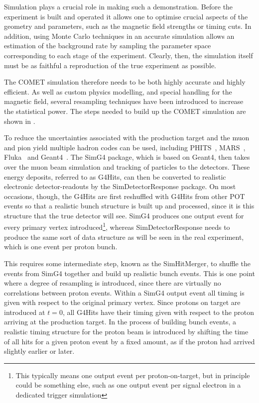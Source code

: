 Simulation plays a crucial role in making such a demonstration. 
Before the experiment is built and operated it allows one to optimise crucial aspects of the geometry and parameters, such as the magnetic field strengths or timing cuts.
In addition, using Monte Carlo techniques in an accurate simulation allows an estimation of the background rate by sampling the parameter space corresponding to each stage of the experiment.
Clearly, then, the simulation itself must be as faithful a reproduction of the true experiment as possible.
\FigSimulationOverview

The COMET simulation therefore needs to be both highly accurate and highly efficient.
As well as custom physics modelling, and special handling for the magnetic field, several resampling techniques have been introduced to increase the statistical power.
The steps needed to build up the COMET simulation are shown in .

To reduce the uncertainties associated with the production target and the muon and pion yield multiple hadron codes can be used, including PHITS~\cite{PHITS2002}, MARS~\cite{MARS1995}, Fluka~\cite{FLUKA2005} and Geant4~\cite{Geant42003}.
The SimG4 package, which is based on Geant4, then takes over the muon beam simulation and tracking of particles to the detectors.
These energy deposits, referred to as G4Hits, can then be converted to realistic electronic detector-readouts by the SimDetectorResponse package.
On most occasions, though, the G4Hits are first reshuffled with G4Hits from other \acf{POT} events so that a realistic bunch structure is built up and processed, since it is this structure that the true detector will see.
SimG4 produces one output event for every primary vertex introduced\footnote{This typically means one output event per proton-on-target, but in principle could be something else, such as one output event per signal electron in a dedicated trigger simulation}, %
whereas SimDetectorResponse needs to produce the same sort of data structure as will be seen in the real experiment, which is one event per proton bunch.

This requires some intermediate step, known as the SimHitMerger, to shuffle the events from SimG4 together and build up realistic bunch events.
This is one point where a degree of resampling is introduced, since there are virtually no correlations between proton events.
Within a SimG4 output event all timing is given with respect to the original primary vertex.  
Since protons on target are introduced at $t=0$, all G4Hits have their timing given with respect to the proton arriving at the production target.
In the process of building bunch events, a realistic timing structure for the proton beam is introduced by shifting the time of all hits for a given proton event by a fixed amount, as if the proton had arrived slightly earlier or later.

